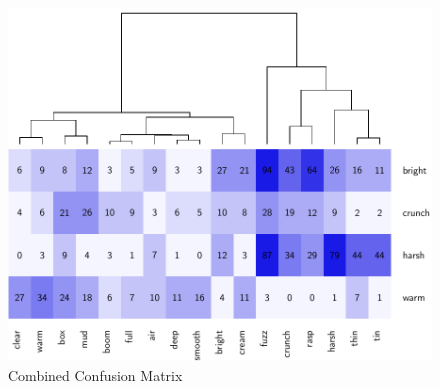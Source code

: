 		\begin{figure}[h!]
			\centering
			\includegraphics{chapter7/Images/CombinedConfusion.pdf}
			\caption{Combined Confusion Matrix}
		\end{figure}
